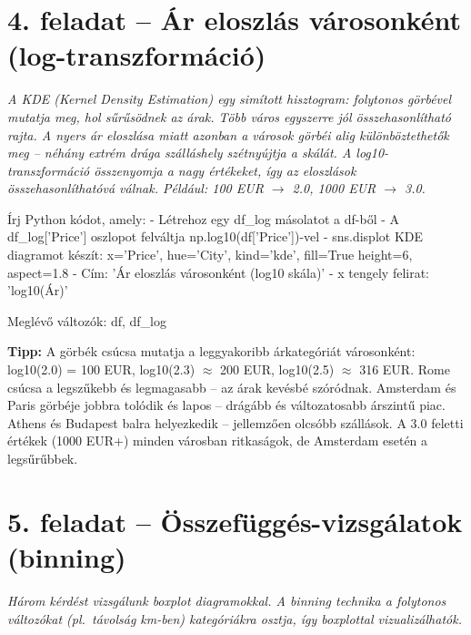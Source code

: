 \documentclass[11pt,a4paper]{article}
\newcommand{\tip}[1]{%
  \vspace{3pt}%
  \begin{tcolorbox}[tipstyle]%
  \textbf{\textcolor{tipborder}{Tipp:}} #1%
  \end{tcolorbox}\vspace{2pt}}
\begin{document}
\section{4. feladat -- Ár eloszlás városonként (log-transzformáció)}

\noindent\textit{A KDE (Kernel Density Estimation) egy simított hisztogram:
folytonos görbével mutatja meg, hol sűrűsödnek az árak.
Több város egyszerre jól összehasonlítható rajta.
A nyers ár eloszlása miatt azonban a városok görbéi alig különböztethetők meg --
néhány extrém drága szálláshely szétnyújtja a skálát.
A log10-transzformáció összenyomja a nagy értékeket,
így az eloszlások összehasonlíthatóvá válnak.
Például: 100 EUR $\to$ 2.0, 1000 EUR $\to$ 3.0.}

\begin{prompt}
Írj Python kódot, amely:
- Létrehoz egy df_log másolatot a df-ből
- A df_log['Price'] oszlopot felváltja np.log10(df['Price'])-vel
- sns.displot KDE diagramot készít:
  x='Price', hue='City', kind='kde', fill=True
  height=6, aspect=1.8
- Cím: 'Ár eloszlás városonként (log10 skála)'
- x tengely felirat: 'log10(Ár)'

Meglévő változók: df, df_log
\end{prompt}

\tip{A görbék csúcsa mutatja a leggyakoribb árkategóriát városonként:
log10(2.0) = 100 EUR, log10(2.3) $\approx$ 200 EUR, log10(2.5) $\approx$ 316 EUR.
Rome csúcsa a legszűkebb és legmagasabb -- az árak kevésbé szóródnak.
Amsterdam és Paris görbéje jobbra tolódik és lapos -- drágább és változatosabb árszintű piac.
Athens és Budapest balra helyezkedik -- jellemzően olcsóbb szállások.
A 3.0 feletti értékek (1000 EUR+) minden városban ritkaságok,
de Amsterdam esetén a legsűrűbbek.}

\section{5. feladat -- Összefüggés-vizsgálatok (binning)}

\noindent\textit{Három kérdést vizsgálunk boxplot diagramokkal.
A binning technika a folytonos változókat (pl.\ távolság km-ben)
kategóriákra osztja, így boxplottal vizualizálhatók.}
\end{document}
